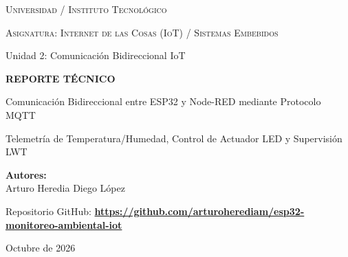 \begin{titlepage}
    \centering
    \vspace*{1.0cm}
    
    {\scshape\Large Universidad / Instituto Tecnológico \par}
    \vspace{0.3cm}
    {\scshape\large Asignatura: Internet de las Cosas (IoT) / Sistemas Embebidos \par}
    \vspace{0.2cm}
    {\large Unidad 2: Comunicación Bidireccional IoT \par}
    
    \vspace{2.0cm}
    
    \begin{tcolorbox}[colback=primaryBlue,colframe=primaryBlue,arc=2mm,center,width=0.95\textwidth]
        \centering\color{white}
        \vspace{0.3cm}
        {\LARGE\bfseries REPORTE TÉCNICO \par}
        \vspace{0.25cm}
        {\Large Comunicación Bidireccional entre ESP32 y Node-RED mediante Protocolo MQTT \par}
        \vspace{0.2cm}
        {\small Telemetría de Temperatura/Humedad, Control de Actuador LED y Supervisión LWT \par}
        \vspace{0.3cm}
    \end{tcolorbox}
    
    \vspace{2.5cm}
    
    \begin{minipage}[t]{0.85\textwidth}
        \centering \large
        \textbf{Autores:}\\
        \vspace{0.2cm}
        {\Large Arturo Heredia \quad \textbar \quad Diego López}
    \end{minipage}
    
    \vspace{2.5cm}
    
    \begin{infobox}
        \centering\small
        Repositorio GitHub: \textbf{\url{https://github.com/arturoherediam/esp32-monitoreo-ambiental-iot}}
    \end{infobox}
    
    \vfill
    
    {\large Octubre de 2026 \par}
\end{titlepage}
